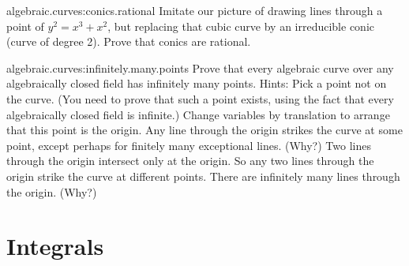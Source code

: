 \begin{problem}{algebraic.curves:conics.rational}
Imitate our picture of drawing lines through a point of \(y^2=x^3+x^2\), but replacing that cubic curve by an irreducible conic (curve of degree 2).
Prove that conics are rational.
\end{problem}


\begin{problem}{algebraic.curves:infinitely.many.points}
Prove that every algebraic curve over any algebraically closed field has infinitely many points.
Hints: Pick a point not on the curve. (You need to prove that such a point exists, using the fact that every algebraically closed field is infinite.)
Change variables by translation to arrange that this point is the origin.
Any line through the origin strikes the curve at some point, except perhaps for finitely many exceptional lines. (Why?)
Two lines through the origin intersect only at the origin.
So any two lines through the origin strike the curve at different points.
There are infinitely many lines through the origin. (Why?)
\end{problem}


\section{Integrals}

